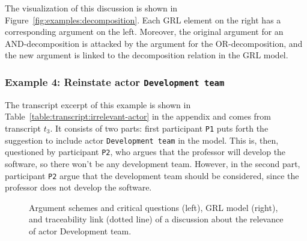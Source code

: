 The visualization of this discussion is shown in Figure~\ref{fig:examples:decomposition}. Each GRL element on the right has a corresponding argument on the left. Moreover, the original argument for an AND-decomposition is attacked by the argument for the OR-decomposition, and the new argument is linked to the decomposition relation in the GRL model.

\subsubsection{Example 4: Reinstate actor \texttt{Development team}}

The transcript excerpt of this example is shown in Table~\ref{table:transcript:irrelevant-actor} in the appendix and comes from transcript $t_3$. It consists of two parts: first participant \texttt{P1} puts forth the suggestion to include actor \texttt{Development team} in the model. This is, then, questioned by participant \texttt{P2}, who argues that the professor will develop the software, so there won't be any development team. However, in the second part, participant \texttt{P2} argue that the development team should be considered, since the professor does not develop the software.

\begin{figure}[ht!]
\centering
\caption{Argument schemes and critical questions (left), GRL model (right), and traceability link (dotted line) of a discussion about the relevance of actor Development team.}
\label{fig:examples:relevant-actor}
\end{figure}


